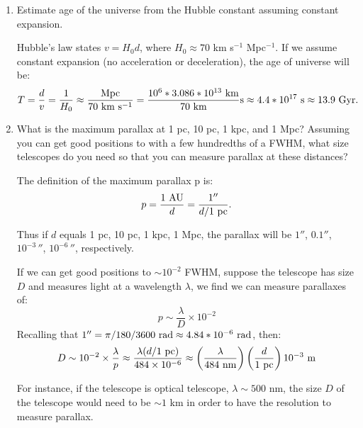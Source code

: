 \begin{enumerate} 
\item Estimate age of the universe from the Hubble constant assuming
    constant expansion.

\begin{answer}
Hubble's law states $v = H_0 d$, where $H_0\approx 70$ km s$^{-1}$
Mpc$^{-1}$. If we assume constant expansion (no acceleration or
deceleration), the age of universe will be:
\begin{equation}
T = \frac{d}{v}=\frac{1}{H_0}\approx
\frac{{\rm Mpc}}{70 {\rm ~km} {\rm ~s}^{-1}} =
\frac{10^6*3.086*10^{13} {\rm ~km}}{70 {\rm ~km}} {\rm s}\approx
4.4*10^{17} {\rm ~s}\approx 13.9 {\rm ~Gyr}.
\end{equation}
\end{answer}

\item What is the maximum parallax at 1 pc, 10 pc, 1 kpc, and 1 Mpc?
    Assuming you can get good positions to with a few hundredths of a
    FWHM, what size telescopes do you need so that you can measure
    parallax at these distances?

\begin{answer}
The definition of the maximum parallax p is:
\begin{equation}
    p = \frac{1 {\rm ~AU}}{d} = \frac{1''}{d / 1 {\rm ~pc}}.
\end{equation}

Thus if $d$ equals 1 pc, 10 pc, 1 kpc, 1 Mpc, the parallax will be
$1''$, $0.1''$, $10^{-3}\,''$, $10^{-6}\,''$, respectively. 

If we can get good positions to $\sim 10^{-2}$ FWHM, suppose the
telescope has size $D$ and measures light at a wavelength $\lambda$,
we find we can measure parallaxes of:
\begin{equation}
    p \sim \frac{\lambda}{D} \times 10^{-2}
\end{equation}
Recalling that $1'' = \pi / 180 / 3600 {\rm ~rad} \approx 4.84*10^{-6}
{\rm ~rad}$, then:
\begin{equation}
    D \sim 10^{-2} \times \frac{\lambda}{p}\approx \frac{\lambda (d /
    1 {\rm ~pc})}{484\times 10^{-6}} \approx
    \left(\frac{\lambda}{484 {\rm ~nm}}\right)
    \left(\frac{d}{1 {\rm ~pc}}\right) 10^{-3} {\rm ~m}
\end{equation}

For instance, if the telescope is optical telescope, $\lambda \sim
500$ nm, the size $D$ of the telescope would need to be $\sim 1$ km in
order to have the resolution to measure parallax.


\end{answer}
\end{enumerate}
